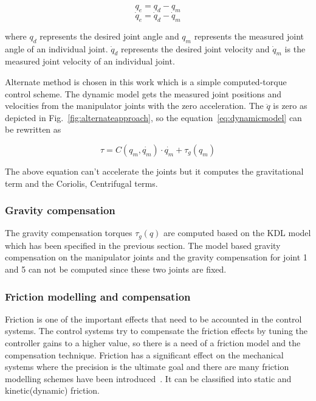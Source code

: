 \begin{equation}
q_e = q_d - q_m
\end{equation}
\begin{equation}
\dot{q}_e = \dot{q}_d - \dot{q}_m
\end{equation}

where $q_d$ represents the desired joint angle and $q_m$ represents the measured joint angle of an individual joint. $\dot{q}_d$ represents the desired joint velocity and $\dot{q}_m$ is the measured joint velocity of an individual joint.

Alternate method is chosen in this work which is a simple computed-torque control scheme. The dynamic model gets the measured joint positions and velocities from the manipulator joints with the zero acceleration. The $\ddot{q}$ is zero as depicted in Fig.~\ref{fig:alternateapproach}, so the equation~\eqref{eq:dynamicmodel} can be rewritten as 

\begin{equation}
\tau = C(q_m, \dot{q_m})\cdot \dot{q_m} + \tau_g(q_m)
\end{equation}

The above equation can't accelerate the joints but it computes the gravitational term and the Coriolis, Centrifugal terms. 

\subsubsection*{Gravity compensation}

The gravity compensation torques $\tau_g(q)$ are computed based on the KDL model which has been specified in the previous section. The model based gravity compensation on the manipulator joints and the gravity compensation for joint 1 and 5 can not be computed since these two joints are fixed.

\subsubsection*{Friction modelling and compensation}

Friction is one of the important effects that need to be accounted in the control systems. The control systems try to compensate the friction effects by tuning the controller gains to a higher value, so there is a need of a friction model and the compensation technique. Friction has a significant effect on the mechanical systems where the precision is the ultimate goal and there are many friction modelling schemes have been introduced~\cite{corberan2012haptic}. It can be classified into static and kinetic(dynamic) friction.

